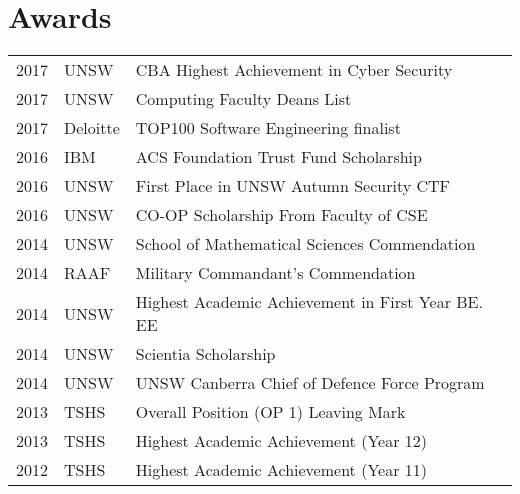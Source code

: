 \documentclass[letterpaper]{deedy-resume} %
\begin{document}
\begin{minipage}[t]{0.60\textwidth}

%
%
%


%
%


\section{Awards} 

\begin{tabular}{rll}
2017 & UNSW & CBA Highest Achievement in Cyber Security \\
2017 & UNSW & Computing Faculty Deans List \\
2017 & Deloitte & TOP100 Software Engineering finalist \\
2016 & IBM &  ACS Foundation Trust Fund Scholarship \\
2016 & UNSW & First Place in UNSW Autumn Security CTF \\
2016 & UNSW & CO-OP Scholarship From Faculty of CSE\\
2014 & UNSW & School of Mathematical Sciences Commendation\\
2014 & RAAF & Military Commandant's Commendation\\
2014 & UNSW & Highest Academic Achievement in First Year BE. EE\\
2014 & UNSW & Scientia Scholarship\\
2014 & UNSW & UNSW Canberra Chief of Defence Force Program\\
2013	& TSHS & Overall Position (OP 1) Leaving Mark\\
2013 & TSHS & Highest Academic Achievement (Year 12)\\
2012 & TSHS & Highest Academic Achievement (Year 11)\\
\end{tabular}


\end{minipage}
\end{document}
